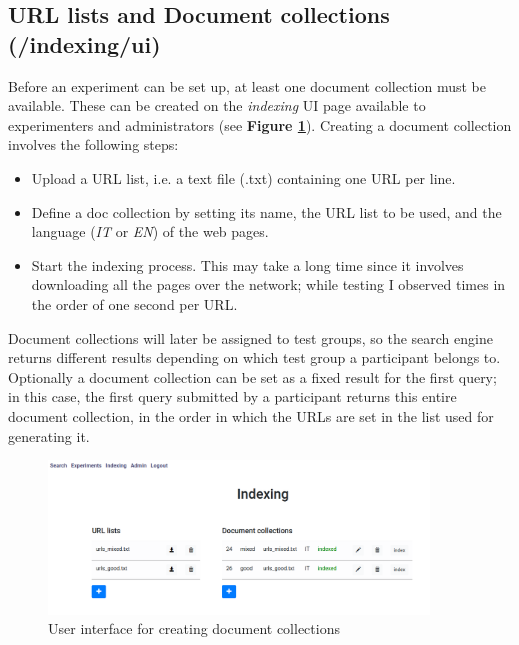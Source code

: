 \documentclass[a4paper]{usiinfbachelorproject}
\begin{document}
\begin{appendices}
        \subsection{URL lists and Document collections \small{(/indexing/ui)}}

        Before an experiment can be set up, at least one document collection must be available. These can be created on the \emph{indexing}
        UI page available to experimenters and administrators (see \textbf{Figure \ref{fig:indexingUi}}). Creating a document collection involves
        the following steps:
        \begin{itemize}

        \item Upload a URL list, i.e. a text file (.txt) containing one URL per line.

        \item Define a doc collection by setting its name, the URL list to be used, and the language (\emph{IT} or \emph{EN})
                of the web pages.

        \item Start the indexing process. This may take a long time since it involves downloading all the pages over the network;
              while testing I observed times in the order of one second per URL.

        \end{itemize}

        Document collections will later be assigned 
        to test groups, so the search engine returns different results depending on which test group a participant belongs to. Optionally
        a document collection can be set as a fixed result for the first query; in this case, the first query submitted by a
        participant returns this entire document collection, in the order in which the URLs are set in the list used for generating it.

        \begin{figure} [h]
        \centering
        \includegraphics[width=0.9\textwidth]{figures/indexingUi}
        \caption[]{User interface for creating document collections}
        \label{fig:indexingUi}
        \end{figure}


\end{appendices}
\end{document}
